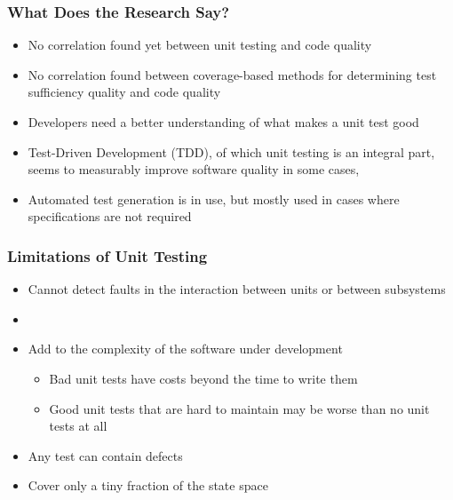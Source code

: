 \documentclass{beamer}
\begin{document}
\begin{frame}
\frametitle{What Does the Research Say?}
\begin{itemize}
	\item No correlation found yet between unit testing and code quality\cite{codeQual}
	\item No correlation found between coverage-based methods for determining test sufficiency  quality and code quality\cite{codeQual}
	\item Developers need a better understanding of what makes a unit test good\cite{unitTestSurv}
	\item Test-Driven Development (TDD), of which unit testing is an integral part, seems to measurably improve software quality in some cases\cite{tddMeta},\cite{doesTDDWork}
	\item Automated test generation is in use, but mostly used in cases where specifications are not required\cite{unitTestSurv}
\end{itemize}
\end{frame}


\begin{frame}
\frametitle{Limitations of Unit Testing}
\begin{itemize}
	\item Cannot detect faults in the interaction between units or between subsystems
	\item 
	\item Add to the complexity of the software under development
	\begin{itemize}
		\item Bad unit tests have costs beyond the time to write them
		\item Good unit tests that are hard to maintain may be worse than no unit tests at all
	\end{itemize}
	\item Any test can contain defects
	\item Cover only a tiny fraction of the state space
\end{itemize}
\end{frame}
\end{document}
